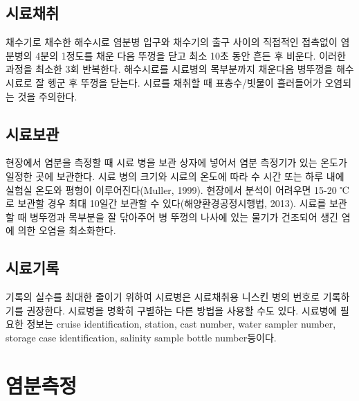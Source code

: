 \documentclass[
]{book}
\begin{document}
\hypertarget{uxc2dcuxb8ccuxcc44uxcde8}{%
\subsection{시료채취}\label{uxc2dcuxb8ccuxcc44uxcde8}}

채수기로 채수한 해수시료 염분병 입구와 채수기의 출구 사이의 직접적인 접촉없이 염분병의 4분의 1정도를 채운 다음 뚜껑을 닫고 최소 10초 동안 흔든 후 비운다. 이러한 과정을 최소한 3회 반복한다. 해수시료를 시료병의 목부분까지 채운다음 병뚜껑을 해수시료로 잘 헹군 후 뚜껑을 닫는다. 시료를 채취할 때 표층수/빗물이 흘러들어가 오염되는 것을 주의한다.

\hypertarget{uxc2dcuxb8ccuxbcf4uxad00}{%
\subsection{시료보관}\label{uxc2dcuxb8ccuxbcf4uxad00}}

현장에서 염분을 측정할 때 시료 병을 보관 상자에 넣어서 염분 측정기가 있는 온도가 일정한 곳에 보관한다. 시료 병의 크기와 시료의 온도에 따라 수 시간 또는 하루 내에 실험실 온도와 평형이 이루어진다(Muller, 1999). 현장에서 분석이 어려우면 15-20 ℃로 보관할 경우 최대 10일간 보관할 수 있다(해양환경공정시행법, 2013). 시료를 보관할 때 병뚜껑과 목부분을 잘 닦아주어 병 뚜껑의 나사에 있는 물기가 건조되어 생긴 염에 의한 오염을 최소화한다.

\hypertarget{uxc2dcuxb8ccuxae30uxb85d}{%
\subsection{시료기록}\label{uxc2dcuxb8ccuxae30uxb85d}}

기록의 실수를 최대한 줄이기 위하여 시료병은 시료채취용 니스킨 병의 번호로 기록하기를 권장한다. 시료병을 명확히 구별하는 다른 방법을 사용할 수도 있다. 시료병에 필요한 정보는 cruise identification, station, cast number, water sampler number, storage case identification, salinity sample bottle number등이다.

\hypertarget{uxc5fcuxbd84uxce21uxc815}{%
\section{염분측정}\label{uxc5fcuxbd84uxce21uxc815}}
\end{document}
